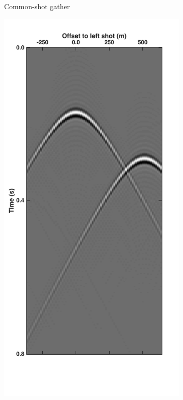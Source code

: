 \begin{figure}
\begin{subfigure}[t]{0.25\textwidth}
		\caption{Common-shot gather}
		\label{fig:Ch-Theory-PseudoDeblendedCSG2}
	\end{subfigure}
	\centering
	\begin{subfigure}[t]{0.25\textwidth}
		\includegraphics[width=\textwidth]{Plots/Mahdad/30iter/Pseudo-DeblendedCSG_sh1}	

\end{subfigure}
\end{figure}
